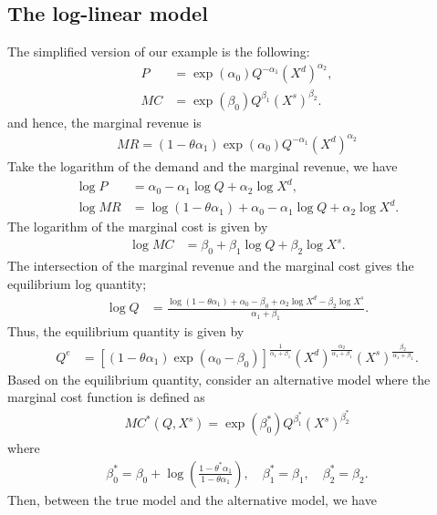 \documentclass[11pt, a4paper]{article}
\theoremstyle{remark}
\begin{document}
\subsection{The log-linear model}
The simplified version of our example is the following:
\begin{align}
    P & = \exp(\alpha_0) Q^{-\alpha_1} (X^{d})^{\alpha_2}, \\
    MC & = \exp(\beta_0) Q^{\beta_1} (X^{s})^{\beta_2}.
\end{align}
and hence, the marginal revenue is
\begin{align}
    MR = (1- \theta\alpha_1)\exp(\alpha_0) Q^{-\alpha_1} (X^{d})^{\alpha_2}
\end{align}
Take the logarithm of the demand and the marginal revenue, we have
\begin{align}
    \log P & = \alpha_0 -\alpha_1 \log Q + \alpha_2 \log X^{d},\\
    \log MR& = \log (1 -\theta\alpha_1) + \alpha_0 -\alpha_1 \log Q + \alpha_2 \log X^{d}.
\end{align}
The logarithm of the marginal cost is given by
\begin{align}
    \log MC & = \beta_0 + \beta_1 \log Q + \beta_2 \log X^{s}.
\end{align}
The intersection of the marginal revenue and the marginal cost gives the equilibrium log quantity;
\begin{align}
    \log Q &= \frac{ \log (1 - \theta \alpha_1) + \alpha_0 - \beta_0 +\alpha_2 \log X^{d} - \beta_2 \log X^{s}}{\alpha_1 + \beta_1}.
\end{align}
Thus, the equilibrium quantity is given by
\begin{align}
    Q^e &= \left[(1 - \theta \alpha_1)\exp(\alpha_0 - \beta_0)\right]^{\frac{1}{\alpha_1 + \beta_1}} (X^{d})^{\frac{\alpha_2}{\alpha_1 + \beta_1}} (X^{s})^{\frac{\beta_2}{\alpha_1 + \beta_1}}.
\end{align}
Based on the equilibrium quantity, consider an alternative model where the marginal cost function is defined as
\begin{align}
    MC^{*}(Q, X^{s}) = \exp(\beta_0^*) Q^{\beta_1^*} (X^{s})^{\beta_2^*}
\end{align}
where 
\begin{align}
    \beta_0^* = \beta_0 + \log\left(\frac{1-\theta^*\alpha_1}{1 - \theta\alpha_1}\right),\quad\beta_1^* = \beta_1,\quad \beta_2^* = \beta_2.
\end{align}
Then, between the true model and the alternative model, we have 
\end{document}
